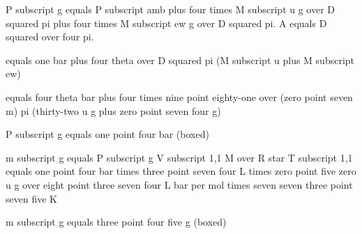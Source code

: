 P subscript g equals P subscript amb plus four times M subscript u g over D squared pi plus four times M subscript ew g over D squared pi. A equals D squared over four pi.

equals one bar plus four theta over D squared pi (M subscript u plus M subscript ew)

equals four theta bar plus four times nine point eighty-one over (zero point seven m) pi (thirty-two u g plus zero point seven four g)

P subscript g equals one point four bar (boxed)

m subscript g equals P subscript g V subscript 1,1 M over R star T subscript 1,1 equals one point four bar times three point seven four L times zero point five zero u g over eight point three seven four L bar per mol times seven seven three point seven five K

m subscript g equals three point four five g (boxed)